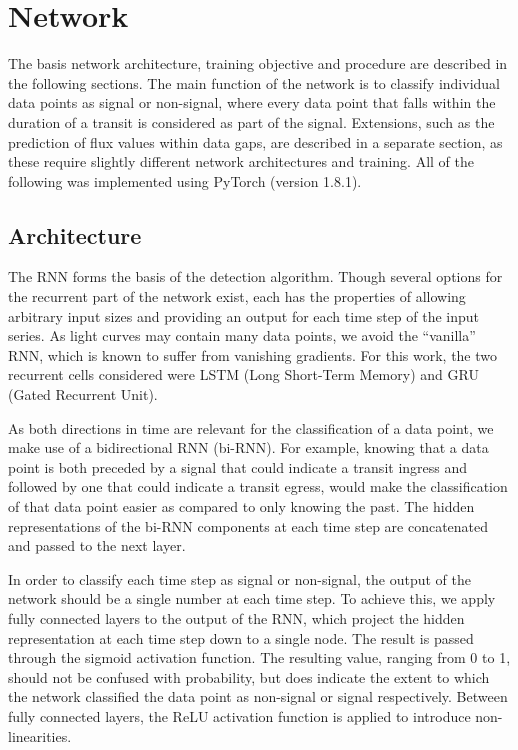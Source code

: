
\section{Network}


The basis network architecture, training objective and procedure are described in the following sections. The main function of the network is to classify individual data points as signal or non-signal, where every data point that falls within the duration of a transit is considered as part of the signal. Extensions, such as the prediction of flux values within data gaps, are described in a separate section, as these require slightly different network architectures and training. All of the following was implemented using PyTorch (version 1.8.1).


\subsection{Architecture}

The RNN forms the basis of the detection algorithm. Though several options for the recurrent part of the network exist, each has the properties of allowing arbitrary input sizes and providing an output for each time step of the input series. As light curves may contain many data points, we avoid the ``vanilla'' RNN, which is known to suffer from vanishing gradients. For this work, the two recurrent cells considered were LSTM (Long Short-Term Memory) and GRU (Gated Recurrent Unit). 

As both directions in time are relevant for the classification of a data point, we make use of a bidirectional RNN (bi-RNN). For example, knowing that a data point is both preceded by a signal that could indicate a transit ingress and followed by one that could indicate a transit egress, would make the classification of that data point easier as compared to only knowing the past. The hidden representations of the bi-RNN components at each time step are concatenated and passed to the next layer.

In order to classify each time step as signal or non-signal, the output of the network should be a single number at each time step. To achieve this, we apply fully connected layers to the output of the RNN, which project the hidden representation at each time step down to a single node. The result is passed through the sigmoid activation function. The resulting value, ranging from 0 to 1, should not be confused with probability, but does indicate the extent to which the network classified the data point as non-signal or signal respectively. Between fully connected layers, the ReLU activation function is applied to introduce non-linearities.


